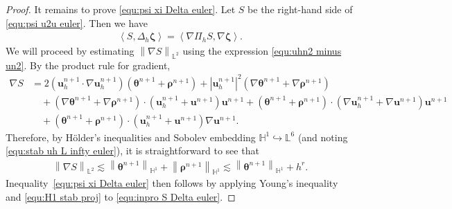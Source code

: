 \documentclass[11pt, reqno]{amsart}
\theoremstyle{definition}
\theoremstyle{remark}
\numberwithin{equation}{section}
\newcommand{\bff}{\boldsymbol}
\newcommand{\bb}{\mathbb}
\newcommand{\norm}[2]{\left\|{#1}\right\|_{#2}}
\newcommand{\inpro}[2]{\left\langle#1,#2\right\rangle}
\newcommand{\abs}[1]{\left|{#1}\right|}
\begin{document}
\begin{proof}
	It remains to prove \eqref{equ:psi xi Delta euler}. Let $S$ be the right-hand side of \eqref{equ:psi u2u euler}. Then we have
	\begin{align}\label{equ:inpro S Delta euler}
		\inpro{S}{\Delta_h \bff{\zeta}}
		=
		\inpro{\nabla \Pi_h S}{\nabla \bff{\zeta}}.
	\end{align}
	We will proceed by estimating $\norm{\nabla S}{\bb{L}^2}$ using the expression \eqref{equ:uhn2 minus un2}. By the product rule for gradient,
	\begin{align*}
		\nabla S
		&=
		2\left(\bff{u}_h^{n+1}\cdot \nabla \bff{u}_h^{n+1}\right) \left(\bff{\theta}^{n+1}+\bff{\rho}^{n+1}\right)
		+
		\abs{\bff{u}_h^{n+1}}^2 \left(\nabla \bff{\theta}^{n+1}+\nabla \bff{\rho}^{n+1}\right)
		\\
		&\quad
		+
		\left(\nabla \bff{\theta}^{n+1}+\nabla \bff{\rho}^{n+1}\right) \cdot \left(\bff{u}_h^{n+1}+\bff{u}^{n+1}\right) \bff{u}^{n+1}
		+
		\left(\bff{\theta}^{n+1}+\bff{\rho}^{n+1}\right)\cdot \left(\nabla \bff{u}_h^{n+1}+\nabla \bff{u}^{n+1}\right) \bff{u}^{n+1}
		\\
		&\quad
		+
		\left(\bff{\theta}^{n+1}+\bff{\rho}^{n+1}\right) \cdot \left(\bff{u}_h^{n+1}+\bff{u}^{n+1}\right) \nabla \bff{u}^{n+1}.
	\end{align*}
	Therefore, by H\"older's inequalities and Sobolev embedding $\bb{H}^1\hookrightarrow \bb{L}^6$ (and noting \eqref{equ:stab uh L infty euler}), it is straightforward to see that
	\begin{align*}
		\norm{\nabla S}{\bb{L}^2} \lesssim \norm{\bff{\theta}^{n+1}}{\bb{H}^1} + \norm{\bff{\rho}^{n+1}}{\bb{H}^1}
		\lesssim
		\norm{\bff{\theta}^{n+1}}{\bb{H}^1} + h^r.
	\end{align*}
	Inequality~\eqref{equ:psi xi Delta euler} then follows by applying Young's inequality and \eqref{equ:H1 stab proj} to \eqref{equ:inpro S Delta euler}.
\end{proof}
\end{document}
